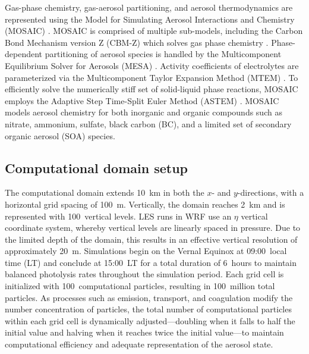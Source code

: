 \documentclass[acp]{copernicus}
\begin{document}
Gas-phase chemistry, gas-aerosol partitioning, and aerosol
thermodynamics are represented using the Model for Simulating Aerosol
Interactions and Chemistry (MOSAIC) \citep{zaveri_model_2008}. MOSAIC
is comprised of multiple sub-models, including the Carbon Bond
Mechanism version Z (CBM-Z) which solves gas phase chemistry
\citep{zaveri_new_1999}. Phase-dependent partitioning of aerosol
species is handled by the Multicomponent Equilibrium Solver for
Aerosols (MESA) \citep{zaveri_computationally_2005}. Activity
coefficients of electrolytes are parameterized via the Multicomponent
Taylor Expansion Method (MTEM) \citep{zaveri_new_2005}. To efficiently
solve the numerically stiff set of solid-liquid phase reactions,
MOSAIC employs the Adaptive Step Time-Split Euler Method (ASTEM)
\citep{zaveri_model_2008}. MOSAIC models aerosol chemistry for both
inorganic and organic compounds such as nitrate, ammonium, sulfate,
black carbon (BC), and a limited set of secondary organic aerosol
(SOA) species.

\subsection{Computational domain setup}

The computational domain extends 10~km in both the $x$- and
$y$-directions, with a horizontal grid spacing of 100~m.  Vertically,
the domain reaches 2~km and is represented with 100~vertical
levels. LES runs in WRF use an $\eta$ vertical coordinate system,
whereby vertical levels are linearly spaced in pressure. Due to the
limited depth of the domain, this results in an effective vertical
resolution of approximately 20~m. Simulations begin on the Vernal
Equinox at 09:00~local time (LT) and conclude at 15:00~LT for a total
duration of 6~hours to maintain balanced photolysis rates throughout
the simulation period. Each grid cell is initialized with
100~computational particles, resulting in 100~million total
particles. As processes such as emission, transport, and coagulation
modify the number concentration of particles, the total number of
computational particles within each grid cell is dynamically
adjusted---doubling when it falls to half the initial value and
halving when it reaches twice the initial value---to maintain
computational efficiency and adequate representation of the aerosol
state. 
\end{document}
